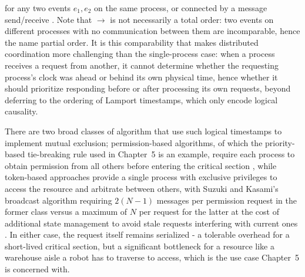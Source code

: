 for any two events $e_1, e_2$ on the same process, or connected by a message send/receive \cite{lamport1978time}. Note that $\rightarrow$ is not necessarily a total order: two events on different processes with no communication between them are incomparable, hence the name partial order. It is this comparability that makes distributed coordination more challenging than the single-process case: when a process receives a request from another, it cannot determine whether the requesting process's clock was ahead or behind its own physical time, hence whether it should prioritize responding before or after processing its own requests, beyond deferring to the ordering of Lamport timestamps, which only encode logical causality.

There are two broad classes of algorithm that use such logical timestamps to implement mutual exclusion; permission-based algorithms, of which the priority-based tie-breaking rule used in Chapter~5 is an example, require each process to obtain permission from all others before entering the critical section \cite{ricart1981optimal}, while token-based approaches provide a single process with exclusive privileges to access the resource and arbitrate between others, with Suzuki and Kasami's broadcast algorithm requiring $2(N-1)$ messages per permission request in the former class versus a maximum of $N$ per request for the latter at the cost of additional state management to avoid stale requests interfering with current ones \cite{suzuki1985distributed}. In either case, the request itself remains serialized - a tolerable overhead for a short-lived critical section, but a significant bottleneck for a resource like a warehouse aisle a robot has to traverse to access, which is the use case Chapter~5 is concerned with.

